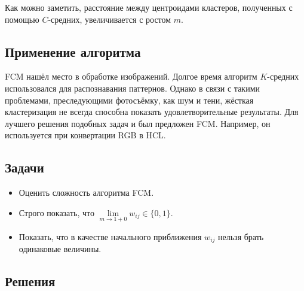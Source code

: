 Как можно заметить, расстояние между центроидами кластеров, полученных с помощью $C$-средних,
увеличивается с ростом $m$.

\subsection{Применение алгоритма}

FCM нашёл место в обработке изображений. Долгое время алгоритм $K$-средних использовался для
распознавания паттернов. Однако в связи с такими проблемами, преследующими фотосъёмку, как шум и
тени, жёсткая кластеризация не всегда способна показать удовлетворительные результаты. Для лучшего
решения подобных задач и был предложен FCM. Например, он используется при конвертации RGB в HCL.

\subsection{Задачи}

\begin{itemize}
    \item Оценить сложность алгоритма FCM.
    \item Строго показать, что $\lim\limits_{m \to 1 + 0} w_{ij} \in \{0, 1\}$.
    \item Показать, что в качестве начального приближения $w_{ij}$ нельзя брать одинаковые величины.
\end{itemize}

\subsection{Решения}

